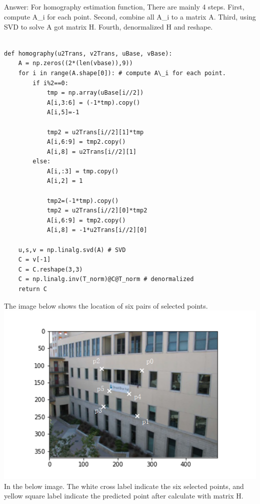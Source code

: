 \documentclass[]{article}
\begin{document}
\subsection{}
Answer: For homography estimation function, There are mainly 4 steps. First, compute A\_i for each point. Second, combine all A\_i to a matrix A. Third, using SVD to solve A got matrix H. Fourth, denormalized H and reshape.\\
\begin{lstlisting}
	
def homography(u2Trans, v2Trans, uBase, vBase):
	A = np.zeros((2*(len(vbase)),9))
	for i in range(A.shape[0]): # compute A\_i for each point.
		if i%2==0:
			tmp = np.array(uBase[i//2])
			A[i,3:6] = (-1*tmp).copy()
			A[i,5]=-1
			
			tmp2 = u2Trans[i//2][1]*tmp
			A[i,6:9] = tmp2.copy()
			A[i,8] = u2Trans[i//2][1]
		else:
			A[i,:3] = tmp.copy()
			A[i,2] = 1
			
			tmp2=(-1*tmp).copy()
			tmp2 = u2Trans[i//2][0]*tmp2
			A[i,6:9] = tmp2.copy()
			A[i,8] = -1*u2Trans[i//2][0]
	
	u,s,v = np.linalg.svd(A) # SVD
	C = v[-1]
	C = C.reshape(3,3)
	C = np.linalg.inv(T_norm)@C@T_norm # denormalized
	return C
\end{lstlisting}
The image below shows the location of six pairs of selected points.\\
\includegraphics[width=\textwidth]{l.png}\\
In the below image. The white cross label indicate the six selected points, and yellow square label indicate the predicted point after calculate with matrix H.\\
\end{document}
